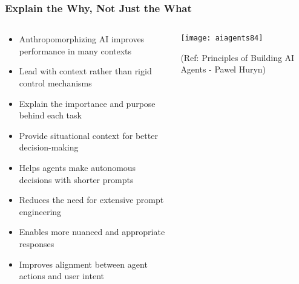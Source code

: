 \begin{frame}[fragile]\frametitle{Explain the Why, Not Just the What}
\begin{columns}
    \begin{column}[T]{0.6\linewidth}
      \begin{itemize}
		\item Anthropomorphizing AI improves performance in many contexts
		\item Lead with context rather than rigid control mechanisms
		\item Explain the importance and purpose behind each task
		\item Provide situational context for better decision-making
		\item Helps agents make autonomous decisions with shorter prompts
		\item Reduces the need for extensive prompt engineering
		\item Enables more nuanced and appropriate responses
		\item Improves alignment between agent actions and user intent
	  \end{itemize}
    \end{column}
    \begin{column}[T]{0.4\linewidth}
		\begin{center}
		\texttt{[image: aiagents84]}
		
		{\tiny (Ref: Principles of Building AI Agents - Pawel Huryn)}
		\end{center}	
    \end{column}
  \end{columns}
\end{frame}

